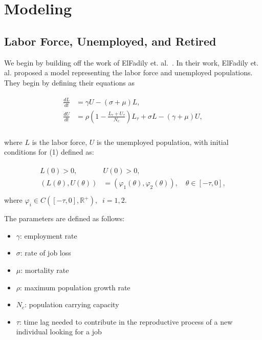 \documentclass{article}
\begin{document}
\section{Modeling}

\subsection{Labor Force, Unemployed, and Retired}

We begin by building off the work of ElFadily et. al.~\cite{ElFadily}. In their work, ElFadily et. al. proposed a model
 representing the labor force and unemployed populations. They begin by defining their equations as

\begin{align}
    \begin{split}
        \frac{dL}{dt} &= \gamma U - (\sigma + \mu)L, \\
        \frac{dU}{dt} &= \rho \left(1 - \frac{L_{\tau} + U_{\tau}}{N_c} \right)L_{\tau} + \sigma L - (\gamma + \mu)U, \\
    \end{split}
\end{align}

where $L$ is the labor force, $U$ is the unemployed population, with initial conditions for (1) defined as:

\begin{align}
    \begin{split}
        L(0) > 0, \quad &U(0) > 0, \\
        (L(\theta),U(\theta)) &= (\varphi_1(\theta), \varphi_2(\theta)), \quad \theta \in [-\tau,0], \\
    \end{split}
\end{align}
where $\varphi_i\in C([-\tau, 0], \mathbb{R}^+),\;\; i=1,2$.

The parameters are defined as follows:

\begin{itemize}
    \item $\gamma$: employment rate
    \item $\sigma$: rate of job loss 
    \item $\mu$: mortality rate
    \item $\rho$: maximum population growth rate 
    \item $N_c$: population carrying capacity 
    \item $\tau$: time lag needed to contribute in the reproductive process of a new individual looking for a job
\end{itemize}
 
\end{document}

